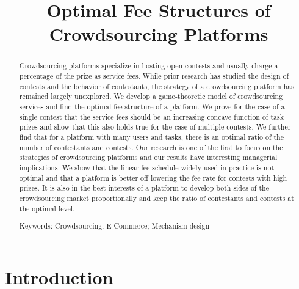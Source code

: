 \documentclass[12pt]{article}
\begin{document}
\title{Optimal Fee Structures of Crowdsourcing Platforms}
\author{}
\date{ }
\maketitle


\begin{abstract}
Crowdsourcing platforms specialize in hosting open contests and usually charge a percentage of the prize as service fees. While prior research has studied the design of contests and the behavior of contestants, the strategy of a crowdsourcing platform has remained largely unexplored. We develop a game-theoretic model of crowdsourcing services and find the optimal fee structure of a platform. We prove for the case of a single contest that the service fees should be an increasing concave function of task prizes and show that this also holds true for the case of multiple contests. We further find that for a platform with many users and tasks, there is an optimal ratio of the number of contestants and contests. Our research is one of the first to focus on the strategies of crowdsourcing platforms and our results have interesting managerial implications. We show that the linear fee schedule widely used in practice is not optimal and that a platform is better off lowering the fee rate for contests with high prizes. It is also in the best interests of a platform to develop both sides of the crowdsourcing market proportionally and keep the ratio of contestants and contests at the optimal level.

Keywords: Crowdsourcing; E-Commerce; Mechanism design
\end{abstract}

\section{Introduction}
\end{document}
